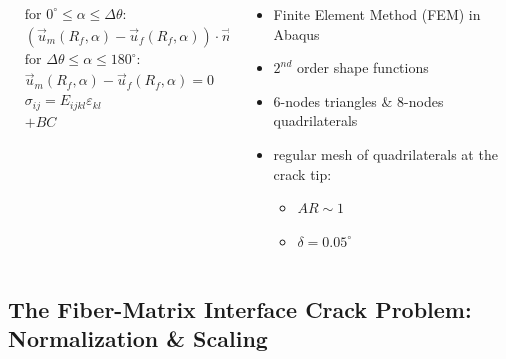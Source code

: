 \documentclass[first,firstsupp,lastsupp,last,hyperref,table]{ETHclass}
\begin{document}
\begin{frame}
\begin{columns}
\begin{column}{0.6\textwidth}
\begin{columns}
\begin{column}{0.6\columnwidth}
\tiny
\begin{equation*}
\begin{aligned}
&\text{for } 0^{\circ}\leq\alpha\leq\Delta\theta:\\
&\left(\overrightarrow{u}_{m}\left(R_{f},\alpha\right)-\overrightarrow{u}_{f}\left(R_{f},\alpha\right)\right)\cdot\overrightarrow{n}_{\alpha}\geq 0\\
&\text{for } \Delta\theta\leq\alpha\leq 180^{\circ}:\\
&\overrightarrow{u}_{m}\left(R_{f},\alpha\right)-\overrightarrow{u}_{f}\left(R_{f},\alpha\right)=0\\
&\sigma_{ij}=E_{ijkl}\varepsilon_{kl}\\
&+BC
\end{aligned}
\end{equation*}
\end{column}
\end{columns}
\end{column}
\begin{column}{0.3\textwidth}
\scriptsize
\begin{itemize}[label=]
\item Finite Element Method (FEM) in Abaqus\texttrademark
\item $2^{nd}$ order shape functions
\item 6-nodes triangles \& 8-nodes quadrilaterals
\item regular mesh of quadrilaterals at the crack tip:
\begin{itemize}[label=-]
\item $AR\sim 1$
\item $\delta=0.05^{\circ}$
\end{itemize}
\end{itemize}
\end{column}
\end{columns}
\end{frame}

\subsection[Normalization \& Scaling]{The Fiber-Matrix Interface Crack Problem: Normalization \& Scaling}
\end{document}
